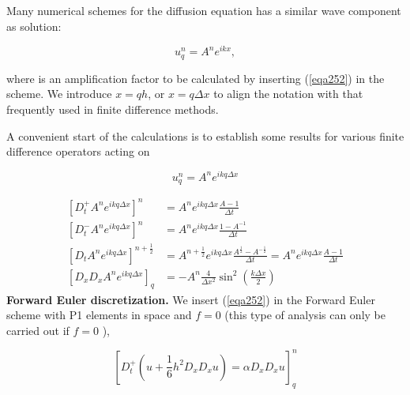 \documentclass[../main.tex]{subfiles}
\begin{document}
		\noindent Many numerical schemes for the diffusion equation has a similar wave component as solution:
		
	\begin{equation}
	\label{eqa251}
		u_{q}^{n}=A^{n} e^{i k x},
	\end{equation}

		\noindent where is an amplification factor to be calculated by inserting (\ref{eqa252}) in the scheme. We introduce $x=q h$, or $x=q \Delta x$ to align the notation with that frequently used in finite difference methods.
		
		A convenient start of the calculations is to establish some results for various finite difference operators acting on
		
	\begin{equation}
	\label{eqa252}
		u_{q}^{n}=A^{n} e^{i k q \Delta x}
	\end{equation}
		
		$$
		\begin{aligned}
			{\left[D_{t}^{+} A^{n} e^{i k q \Delta x}\right]^{n} } &=A^{n} e^{i k q \Delta x} \frac{A-1}{\Delta t} \\
			{\left[D_{t}^{-} A^{n} e^{i k q \Delta x}\right]^{n} } &=A^{n} e^{i k q \Delta x} \frac{1-A^{-1}}{\Delta t} \\
			{\left[D_{t} A^{n} e^{i k q \Delta x}\right]^{n+\frac{1}{2}} } &=A^{n+\frac{1}{2}} e^{i k q \Delta x} \frac{A^{\frac{1}{2}}-A^{-\frac{1}{2}}}{\Delta t}=A^{n} e^{i k q \Delta x} \frac{A-1}{\Delta t} \\
			{\left[D_{x} D_{x} A^{n} e^{i k q \Delta x}\right]_{q} } &=-A^{n} \frac{4}{\Delta x^{2}} \sin ^{2}\left(\frac{k \Delta x}{2}\right)
		\end{aligned}
		$$
		\textbf{Forward Euler discretization.   } We insert (\ref{eqa252}) in the Forward Euler scheme with P1 elements in space and $f=0$ (this type of analysis can only be carried out if $f=0$ ),
		
	\begin{equation}
	\label{253}
		\left[D_{t}^{+}\left(u+\frac{1}{6} h^{2} D_{x} D_{x} u\right)=\alpha D_{x} D_{x} u\right]_{q}^{n}
	\end{equation}
\end{document}
